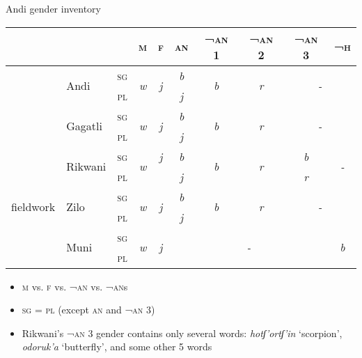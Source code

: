 \documentclass[13pt, t]{beamer}
\begin{document}
\begin{frame}{Andi gender inventory}
\small
\begin{tabular}{|l|l|c|c|c|c|c|c|c|c|}
\hline
\multicolumn{3}{|c|}{}  & \textsc{m} & \textsc{f} & \textsc{an} & \textsc{¬an} 1 & \textsc{¬an} 2 & \textsc{¬an} 3 & \textsc{¬h} \\ \hline
\multirow{2}{*}{\cite{alekseev99}} & \multirow{ 2}{*}{Andi} & \textsc{sg} & \multirow{2}{*}{\textit{w}} & \multirow{2}{*}{\textit{j}} & \textit{b} & \multirow{2}{*}{\textit{b}} & \multirow{2}{*}{\textit{r}} & \multicolumn{2}{|c|}{\multirow{2}{*}{\textit{-}}}  \\ \cline{3-3} \cline{6-6}
 &  & \textsc{pl} & \textit{} & \textit{} & \textit{j} & \textit{} & \textit{} & \multicolumn{2}{|c|}{} \\ \hline
\multirow{2}{*}{\cite{salimov10}} & \multirow{2}{*}{Gagatli} & \textsc{sg} & \multirow{2}{*}{\textit{w}} & \multirow{2}{*}{\textit{j}} & \textit{b} & \multirow{2}{*}{\textit{b}} & \multirow{2}{*}{\textit{r}} & \multicolumn{2}{|c|}{\multirow{2}{*}{\textit{-}}} \\ \cline{3-3} \cline{6-6}
 &  & \textsc{pl} & \textit{} & \textit{} & \textit{j} & \textit{} & \textit{} & \multicolumn{2}{|c|}{} \\ \hline
\multirow{2}{*}{\cite{suleymanov57}} & \multirow{2}{*}{Rikwani} & \textsc{sg} & \multirow{2}{*}{\textit{w}} & \textit{j} & \textit{b} & \multirow{2}{*}{\textit{b}} & \multirow{2}{*}{\textit{r}} & \textit{b} & \multirow{2}{*}{\textit{-}} \\ \cline{3-3} \cline{6-6} \cline{9-9}
 & & \textsc{pl} & \textit{} & \textit{} & \textit{j} & \textit{} & \textit{} & \textit{r} &  \\ \hline
\multirow{2}{*}{fieldwork} & \multirow{2}{*}{Zilo} & \textsc{sg} & \multirow{2}{*}{\textit{w}} & \multirow{2}{*}{\textit{j}} & \textit{b} & \multirow{2}{*}{\textit{b}} & \multirow{2}{*}{\textit{r}} & \multicolumn{2}{|c|}{\multirow{2}{*}{\textit{-}}}  \\ \cline{3-3} \cline{6-6}
 & & \textsc{pl} & \textit{} & \textit{} & \textit{j}& \textit{} & \textit{} & \multicolumn{2}{|c|}{}  \\ \hline
\multirow{2}{*}{\cite{suleymanov57}} & \multirow{2}{*}{Muni} & \textsc{sg} & \multirow{2}{*}{\textit{w}} & \multirow{2}{*}{\textit{j}} & \multicolumn{4}{|c|}{\multirow{2}{*}{\textit{-}}}  & \multirow{2}{*}{\textit{b}} \\ \cline{3-3}
 & & \textsc{pl} & \textit{} & \textit{} & \multicolumn{4}{|c|}{} &  \\ \hline
\end{tabular}
\normalsize
\begin{itemize}
\item \textsc{m} vs. \textsc{f} vs. \textsc{¬an} vs. \textsc{¬an}s 
\item \textsc{sg} = \textsc{pl} (except \textsc{an} and \textsc{¬an 3})
\item Rikwani's \textsc{¬an} 3 gender  contains only several words: \textit{hotʃ'ortʃ'in} `scorpion', \textit{odoruk'a} `butterfly', and some other 5 words


\end{itemize}
\end{frame}
\end{document}

